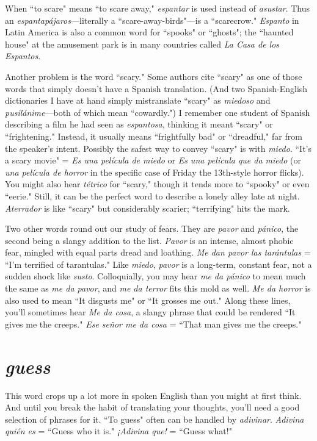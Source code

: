 When ``to scare" means ``to scare away," \emph{espantar} is used instead of \emph{asustar}. Thus an \emph{espantapájaros}---literally a ``scare-away-birds"---is a ``scarecrow." \emph{Espanto} in Latin America is also a common
word for ``spooks" or ``ghosts"; the ``haunted house" at the amusement
park is in many countries called \emph{La Casa de los Espantos}.

Another problem is the word ``scary." Some authors cite ``scary"
as one of those words that simply doesn't have a Spanish translation.
(And two Spanish-English dictionaries I have at hand simply mistranslate ``scary" as \emph{miedoso} and \emph{pusilánime}---both of which mean ``cowardly.") I remember one student of Spanish describing a film he had
seen as \emph{espantosa}, thinking it meant ``scary" or ``frightening." Instead,
it usually means ``frightfully bad" or ``dreadful," far from the speaker's
intent. Possibly the safest way to convey ``scary" is with \emph{miedo}. ``It's a
scary movie" = \emph{Es una película de miedo} or \emph{Es una película que da
	miedo} (or \emph{una película de horror} in the specific case of Friday the 13th-style horror flicks). You might also hear \emph{tétrico} for ``scary," though
it tends more to ``spooky" or even ``eerie." Still, it can be the perfect
word to describe a lonely alley late at night. \emph{Aterrador} is like ``scary"
but considerably scarier; ``terrifying" hits the mark.

Two other words round out our study of fears. They are \emph{pavor}
and \emph{pánico}, the second being a slangy addition to the list. \emph{Pavor} is an
intense, almost phobic fear, mingled with equal parts dread and loathing. \emph{Me dan pavor las tarántulas} = ``I'm terrified of tarantulas." Like
\emph{miedo}, \emph{pavor} is a long-term, constant fear, not a sudden shock like
\emph{susto}. Colloquially, you may hear \emph{me da pánico} to mean much the
same as \emph{me da pavor}, and \emph{me da terror} fits this mold as well. \emph{Me da
	horror} is also used to mean ``It disgusts me" or ``It grosses me out."
Along these lines, you'll sometimes hear \emph{Me da cosa}, a slangy phrase
that could be rendered ``It gives me the creeps." \emph{Ese señor me da cosa}
= ``That man gives me the creeps."

\section{\emph{guess}}

This word crops up a lot more in spoken English than you
might at first think. And until you break the habit of translating your
thoughts, you'll need a good selection of phrases for it. ``To guess" often can be handled by \emph{adivinar}. \emph{Adivina quién es} = ``Guess who it
is." \emph{¡Adivina que!} = ``Guess what!"

